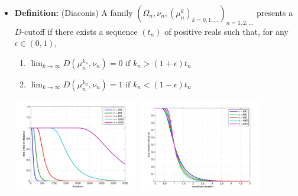 \documentclass[12pt,t]{beamer}
\begin{document}
\begin{frame}
  \begin{itemize}
  \item \textbf{Definition:} (Diaconis) A family $(\Omega_n,\nu_n,
    (\mu^k_n)_{k=0,1,...})_{n=1,2,...}$ presents a $D$-cutoff if there
    exists a sequence $(t_n)$ of positive reals such that, for any
    $\epsilon \in(0,1)$,
    \begin{enumerate}
    \item $\lim_{k \rightarrow \infty}D(\mu^{k_n}_n,\nu_n) = 0 \mbox{ if }
      k_n>(1+\epsilon)t_n$
    \item $\lim_{k \rightarrow \infty}D(\mu^{k_n}_n,\nu_n) = 1 \mbox{ if }
      k_n<(1-\epsilon)t_n $
    \end{enumerate}
    \begin{center}
      \includegraphics[width=0.43\textwidth,trim=1cm 1cm 0cm 0cm]{rdwalk}
      \includegraphics[width=0.43\textwidth,trim=1cm 1cm 0cm 0cm]{rdwalkn}
    \end{center}
  \end{itemize}
\end{frame}
\end{document}

